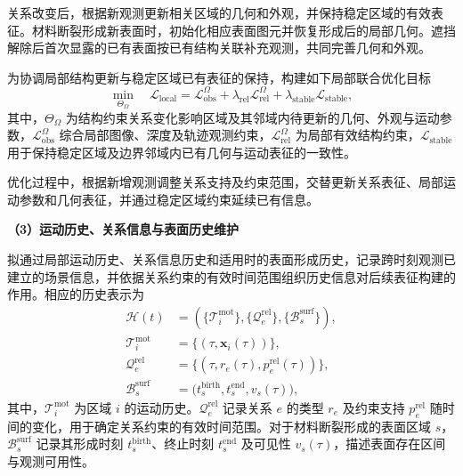 关系改变后，根据新观测更新相关区域的几何和外观，并保持稳定区域的有效表征。材料断裂形成新表面时，初始化相应表面图元并恢复形成后的局部几何。遮挡解除后首次显露的已有表面按已有结构关联补充观测，共同完善几何和外观。

为协调局部结构更新与稳定区域已有表征的保持，构建如下局部联合优化目标
\begin{equation}
  \min_{\Theta_{\Omega}}\quad
  \mathcal{L}_{\mathrm{local}}
  = \mathcal{L}_{\mathrm{obs}}^{\Omega}
  + \lambda_{\mathrm{rel}}\mathcal{L}_{\mathrm{rel}}^{\Omega}
  + \lambda_{\mathrm{stable}}\mathcal{L}_{\mathrm{stable}},
  \label{eq:route-structure-local-objective}
\end{equation}
其中，$\Theta_{\Omega}$ 为结构约束关系变化影响区域及其邻域内待更新的几何、外观与运动参数，$\mathcal{L}_{\mathrm{obs}}^{\Omega}$ 综合局部图像、深度及轨迹观测约束，$\mathcal{L}_{\mathrm{rel}}^{\Omega}$ 为局部有效结构约束，$\mathcal{L}_{\mathrm{stable}}$ 用于保持稳定区域及边界邻域内已有几何与运动表征的一致性。

优化过程中，根据新增观测调整关系支持及约束范围，交替更新关系表征、局部运动参数和几何表征，并通过稳定区域约束延续已有信息。

\noindent\textbf{（3）运动历史、关系信息与表面历史维护}

拟通过局部运动历史、关系信息历史和适用时的表面形成历史，记录跨时刻观测已建立的场景信息，并依据关系约束的有效时间范围组织历史信息对后续表征构建的作用。相应的历史表示为
\begin{equation}
  \begin{aligned}
  \mathcal{H}(t)
  &=
  \left(
    \{\mathcal{T}_{i}^{\mathrm{mot}}\},
    \{\mathcal{Q}_{e}^{\mathrm{rel}}\},
    \{\mathcal{B}_{s}^{\mathrm{surf}}\}
  \right),\\
  \mathcal{T}_{i}^{\mathrm{mot}}
  &=
  \{(\tau,\mathbf{x}_{i}(\tau))\},\\
  \mathcal{Q}_{e}^{\mathrm{rel}}
  &=
  \{(\tau,r_e(\tau),p_e^{\mathrm{rel}}(\tau))\},\\
  \mathcal{B}_{s}^{\mathrm{surf}}
  &=
  \bigl(
    t_{s}^{\mathrm{birth}},
    t_{s}^{\mathrm{end}},
    v_s(\tau)
  \bigr),
  \end{aligned}
  \label{eq:route-structure-information-history}
\end{equation}
其中，$\mathcal{T}_{i}^{\mathrm{mot}}$ 为区域 $i$ 的运动历史。$\mathcal{Q}_{e}^{\mathrm{rel}}$ 记录关系 $e$ 的类型 $r_e$ 及约束支持 $p_e^{\mathrm{rel}}$ 随时间的变化，用于确定关系约束的有效时间范围。对于材料断裂形成的表面区域 $s$，$\mathcal{B}_{s}^{\mathrm{surf}}$ 记录其形成时刻 $t_{s}^{\mathrm{birth}}$、终止时刻 $t_{s}^{\mathrm{end}}$ 及可见性 $v_s(\tau)$，描述表面存在区间与观测可用性。

